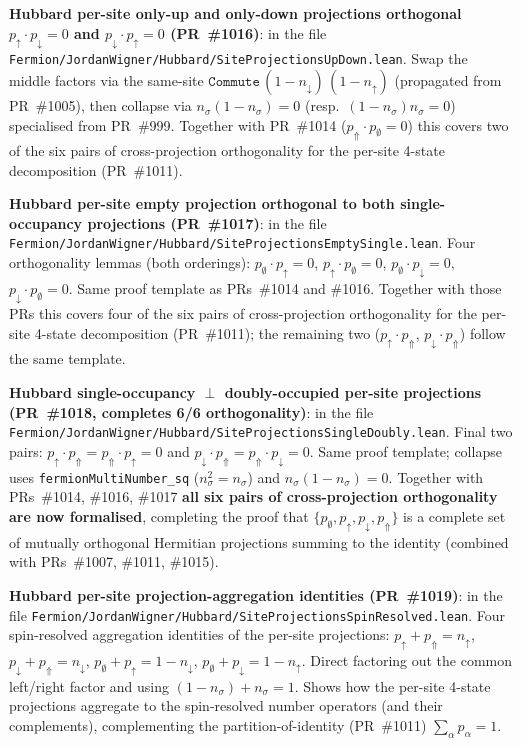 \documentclass[a4paper,11pt]{article}
\begin{document}
\textbf{Hubbard per-site only-up and only-down projections
orthogonal $p_\uparrow\cdot p_\downarrow = 0$ and
$p_\downarrow\cdot p_\uparrow = 0$ (PR~\#1016)}: in the file
\texttt{Fermion/JordanWigner/Hubbard/SiteProjectionsUpDown.lean}.
Swap the middle factors via the same-site
$\texttt{Commute}\,(1 - n_\downarrow)\,(1 - n_\uparrow)$
(propagated from PR~\#1005), then collapse via
$n_\sigma(1 - n_\sigma) = 0$ (resp.\ $(1 - n_\sigma)
n_\sigma = 0$) specialised from PR~\#999. Together with
PR~\#1014 ($p_\Uparrow\cdot p_\emptyset = 0$) this covers two
of the six pairs of cross-projection orthogonality for the
per-site 4-state decomposition (PR~\#1011).

\textbf{Hubbard per-site empty projection orthogonal to both
single-occupancy projections (PR~\#1017)}: in the file
\texttt{Fermion/JordanWigner/Hubbard/SiteProjectionsEmptySingle.lean}.
Four orthogonality lemmas (both orderings):
$p_\emptyset\cdot p_\uparrow = 0$,
$p_\uparrow\cdot p_\emptyset = 0$,
$p_\emptyset\cdot p_\downarrow = 0$,
$p_\downarrow\cdot p_\emptyset = 0$. Same proof template as
PRs~\#1014 and \#1016. Together with those PRs this covers
four of the six pairs of cross-projection orthogonality for
the per-site 4-state decomposition (PR~\#1011); the remaining
two ($p_\uparrow\cdot p_\Uparrow$, $p_\downarrow\cdot
p_\Uparrow$) follow the same template.

\textbf{Hubbard single-occupancy $\perp$ doubly-occupied
per-site projections (PR~\#1018, completes 6/6 orthogonality)}:
in the file
\texttt{Fermion/JordanWigner/Hubbard/SiteProjectionsSingleDoubly.lean}.
Final two pairs:
$p_\uparrow\cdot p_\Uparrow = p_\Uparrow\cdot p_\uparrow = 0$
and $p_\downarrow\cdot p_\Uparrow = p_\Uparrow\cdot
p_\downarrow = 0$. Same proof template; collapse uses
\texttt{fermionMultiNumber\_sq} ($n_\sigma^2 = n_\sigma$) and
$n_\sigma(1 - n_\sigma) = 0$. Together with PRs~\#1014,
\#1016, \#1017 \textbf{all six pairs of cross-projection
orthogonality are now formalised}, completing the proof that
$\{p_\emptyset, p_\uparrow, p_\downarrow, p_\Uparrow\}$ is a
complete set of mutually orthogonal Hermitian projections
summing to the identity (combined with PRs~\#1007, \#1011,
\#1015).

\textbf{Hubbard per-site projection-aggregation identities
(PR~\#1019)}: in the file
\texttt{Fermion/JordanWigner/Hubbard/SiteProjectionsSpinResolved.lean}.
Four spin-resolved aggregation identities of the per-site
projections:
$p_\uparrow + p_\Uparrow = n_\uparrow$,
$p_\downarrow + p_\Uparrow = n_\downarrow$,
$p_\emptyset + p_\uparrow = 1 - n_\downarrow$,
$p_\emptyset + p_\downarrow = 1 - n_\uparrow$.
Direct factoring out the common left/right factor and using
$(1 - n_\sigma) + n_\sigma = 1$. Shows how the per-site 4-state
projections aggregate to the spin-resolved number operators
(and their complements), complementing the partition-of-identity
(PR~\#1011) $\sum_\alpha p_\alpha = 1$.
\end{document}

